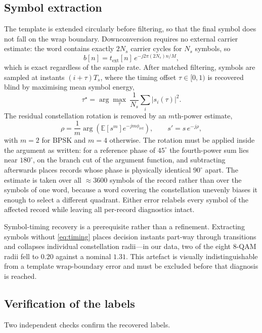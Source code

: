 \documentclass[journal]{IEEEtran}   %
\begin{document}
\subsection{Symbol extraction}
The template is extended circularly before filtering, so that the final symbol
does not fall on the wrap boundary. Downconversion requires no external carrier
estimate: the word contains exactly $2N_s$ carrier cycles for $N_s$ symbols, so
\begin{equation}
b[n] = t_{\mathrm{ext}}[n] \, e^{-j 2\pi (2N_s) n / M},
\label{eq:downconv}
\end{equation}
which is exact regardless of the sample rate. After matched filtering, symbols
are sampled at instants $(i + \tau)T_s$, where the timing offset $\tau \in [0,1)$
is recovered blind by maximising mean symbol energy,
\begin{equation}
\tau^{\star} = \arg\max_{\tau} \ \frac{1}{N_s}\sum_{i} \big| s_i(\tau) \big|^2 .
\label{eq:timing}
\end{equation}
The residual constellation rotation is removed by an $m$th-power estimate,
\begin{equation}
\rho = \frac{1}{m}\arg\!\left(
  \mathbb{E}\!\left[s^m\right] e^{-j m \phi_{\mathrm{ref}}}\right),
\qquad s' = s\,e^{-j\rho},
\label{eq:derotate}
\end{equation}
with $m = 2$ for BPSK and $m = 4$ otherwise. The rotation must be applied inside
the argument as written: for a reference phase of $45^{\circ}$ the fourth-power
sum lies near $180^{\circ}$, on the branch cut of the argument function, and
subtracting afterwards places records whose phase is physically identical
$90^{\circ}$ apart. The estimate is taken over all $\approx3600$ symbols of the
record rather than over the symbols of one word, because a word covering the
constellation unevenly biases it enough to select a different quadrant. Either
error relabels every symbol of the affected record while leaving all per-record
diagnostics intact.

Symbol-timing recovery is a prerequisite rather than a refinement. Extracting
symbols without \eqref{eq:timing} places decision instants part-way through
transitions and collapses individual constellation radii---in our data, two of
the eight 8-QAM radii fell to $0.20$ against a nominal $1.31$. This artefact is
visually indistinguishable from a template wrap-boundary error and must be
excluded before that diagnosis is reached.

\subsection{Verification of the labels}
Two independent checks confirm the recovered labels.
\end{document}
